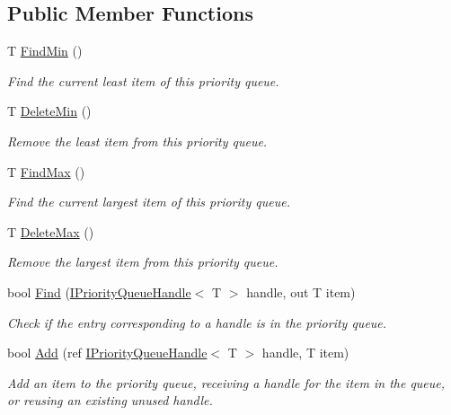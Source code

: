 \subsection*{Public Member Functions}
\begin{DoxyCompactItemize}
\item 
T \hyperlink{interface_c5_1_1_i_priority_queue_ac1dda27afec7f41e9b414b6e33273714}{Find\+Min} ()
\begin{DoxyCompactList}\small\item\em Find the current least item of this priority queue. \end{DoxyCompactList}\item 
T \hyperlink{interface_c5_1_1_i_priority_queue_a278dfa42e80291ba82122f174895dd77}{Delete\+Min} ()
\begin{DoxyCompactList}\small\item\em Remove the least item from this priority queue. \end{DoxyCompactList}\item 
T \hyperlink{interface_c5_1_1_i_priority_queue_ab510a95957edce0bb68aedd85abb73f8}{Find\+Max} ()
\begin{DoxyCompactList}\small\item\em Find the current largest item of this priority queue. \end{DoxyCompactList}\item 
T \hyperlink{interface_c5_1_1_i_priority_queue_a8f728da5fbc6ae1bb4b2941d51885d69}{Delete\+Max} ()
\begin{DoxyCompactList}\small\item\em Remove the largest item from this priority queue. \end{DoxyCompactList}\item 
bool \hyperlink{interface_c5_1_1_i_priority_queue_a4f8bac3647b3b668939a0e9c34c158e5}{Find} (\hyperlink{interface_c5_1_1_i_priority_queue_handle}{I\+Priority\+Queue\+Handle}$<$ T $>$ handle, out T item)
\begin{DoxyCompactList}\small\item\em Check if the entry corresponding to a handle is in the priority queue. \end{DoxyCompactList}\item 
bool \hyperlink{interface_c5_1_1_i_priority_queue_ac90f40246d54cb28935bf89d9e0c9c72}{Add} (ref \hyperlink{interface_c5_1_1_i_priority_queue_handle}{I\+Priority\+Queue\+Handle}$<$ T $>$ handle, T item)
\begin{DoxyCompactList}\small\item\em Add an item to the priority queue, receiving a handle for the item in the queue, or reusing an existing unused handle. \end{DoxyCompactList}\item 

\end{DoxyCompactItemize}

